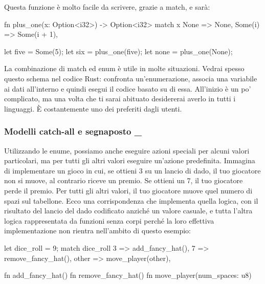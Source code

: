 \documentclass[11pt,a4paper]{article}
\begin{document}
Questa funzione è molto facile da scrivere, grazie a match, e sarà:
\begin{rust}
    fn plus_one(x: Option<i32>) -> Option<i32> {
        match x {
            None => None,
            Some(i) => Some(i + 1),
        }
    }

    let five = Some(5);
    let six = plus_one(five);
    let none = plus_one(None);
\end{rust}

La combinazione di match ed enum è utile in molte situazioni. Vedrai spesso questo schema nel codice Rust: confronta un'enumerazione, associa una variabile ai dati all'interno e quindi esegui il codice basato su di essa. All’inizio è un po’ complicato, ma una volta che ti sarai abituato desidererai averlo in tutti i linguaggi. È costantemente uno dei preferiti dagli utenti.

\subsubsection{Modelli catch-all e segnaposto \_}
Utilizzando le enume, possiamo anche eseguire azioni speciali per alcuni valori particolari, ma per tutti gli altri valori eseguire un'azione predefinita. Immagina di implementare un gioco in cui, se ottieni 3 su un lancio di dado, il tuo giocatore non si muove, al contrario riceve un premio. Se ottieni un 7, il tuo giocatore perde il premio. Per tutti gli altri valori, il tuo giocatore muove quel numero di spazi sul tabellone. Ecco una corrispondenza che implementa quella logica, con il risultato del lancio del dado codificato anziché un valore casuale, e tutta l'altra logica rappresentata da funzioni senza corpi perché la loro effettiva implementazione non rientra nell'ambito di questo esempio:
\begin{rust}
 let dice_roll = 9;
    match dice_roll {
        3 => add_fancy_hat(),
        7 => remove_fancy_hat(),
        other => move_player(other),
    }

    fn add_fancy_hat() {}
    fn remove_fancy_hat() {}
    fn move_player(num_spaces: u8) {}
\end{rust}
\end{document}

